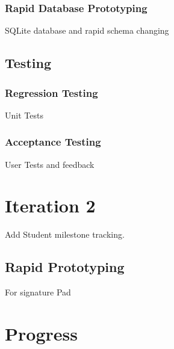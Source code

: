 \documentclass{journal}
\begin{document}
	\subsubsection{Rapid Database Prototyping}
	SQLite database and rapid schema changing
	\subsection{Testing}
	\subsubsection{Regression Testing}
	Unit Tests
	\subsubsection{Acceptance Testing}
	User Tests and feedback
	\newpage
	\section{Iteration 2}
	Add Student milestone tracking.
	\subsection{Rapid Prototyping}
	For signature Pad
	\section{Progress}
\end{document}
